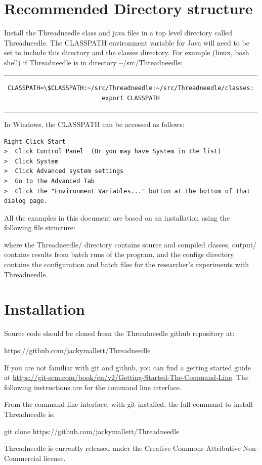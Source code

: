 \documentclass[10pt,oneside,openright, a4paper]{memoir}
\begin{document}
\section{Recommended Directory structure}
Install the Threadneedle class and java files in a top level
directory called Threadneedle.  The CLASSPATH environment variable 
for Java will need to be set to include this directory and the classes 
directory.
For example (linux, bash shell) if Threadneedle is in directory \textasciitilde/src/Threadneedle:
\begin{center}
\begin{tabular}{c}
\begin{lstlisting}
CLASSPATH=\$CLASSPATH:~/src/Threadneedle:~/src/Threadneedle/classes:
export CLASSPATH
\end{lstlisting}
\end{tabular}
\end{center}
In Windows, the CLASSPATH can be accessed as follows:
\begin{lstlisting}
Right Click Start
>  Click Control Panel  (Or you may have System in the list)
>  Click System
>  Click Advanced system settings
>  Go to the Advanced Tab
>  Click the "Environment Variables..." button at the bottom of that dialog page.
\end{lstlisting}
All the examples in this document are based on an installation using
the following file structure:
\par
\begin{figure}[ht]
\centering
{}
\end{figure}
where the Threadneedle/ directory contains source and compiled classes,
output/ contains results from batch runs of the program, and the configs
directory contains the configuration and batch files for the researcher's
experiments with Threadneedle.
\par
\section{Installation}
Source code should be cloned from the Threadneedle github repository at:
\begin{description}[itemindent=3cm, itemsep=1pt]
\item https://github.com/jackymallett/Threadneedle
\end{description}
If you are not familiar with git and github, you can find a getting
started guide at \url{https://git-scm.com/book/en/v2/Getting-Started-The-Command-Line}.
The following instructions are for the command line interface.
\par
From the command line interface, with git installed, the full command to install 
Threadneedle is:
\begin{description}[itemindent=3cm, itemsep=1pt]
\item git clone https://github.com/jackymallett/Threadneedle
\end{description}
Threadneedle is currently released under the Creative Commons Attributive 
Non-Commercial license. 
\end{document}
